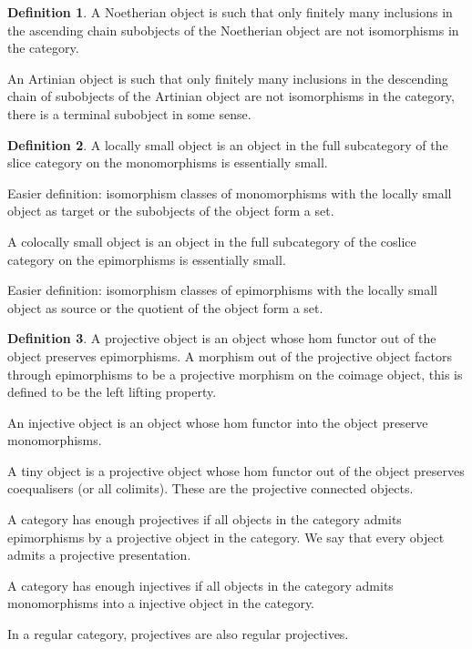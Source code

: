 \documentclass[10pt]{article}
\theoremstyle{plain}%
\theoremstyle{definition}
\newtheorem{definition}{Definition}[section]
\theoremstyle{remark}
\begin{document}
\begin{definition}
    A Noetherian object is such that only finitely many inclusions in the ascending chain subobjects of the Noetherian object are not isomorphisms in the category.

    An Artinian object is such that only finitely many inclusions in the descending chain of subobjects of the Artinian object are not isomorphisms in the category, there is a terminal subobject in some sense.
\end{definition}

\begin{definition}
    A locally small object is an object in the full subcategory of the slice category on the monomorphisms is essentially small.

    Easier definition: isomorphism classes of monomorphisms with the locally small object as target or the subobjects of the object form a set.

    A colocally small object is an object in the full subcategory of the coslice category on the epimorphisms is essentially small.

    Easier definition: isomorphism classes of epimorphisms with the locally small object as source or the quotient of the object form a set.
\end{definition}

\begin{definition}
    A projective object is an object whose hom functor out of the object preserves epimorphisms. A morphism out of the projective object factors through epimorphisms to be a projective morphism on the coimage object, this is defined to be the left lifting property.
    
    An injective object is an object whose hom functor into the object preserve monomorphisms.

    A tiny object is a projective object whose hom functor out of the object preserves coequalisers (or all colimits). These are the projective connected objects.

    A category has enough projectives if all objects in the category admits epimorphisms by a projective object in the category. We say that every object admits a projective presentation.

    A category has enough injectives if all objects in the category admits monomorphisms into a injective object in the category.

    In a regular category, projectives are also regular projectives.
\end{definition}
\end{document}
